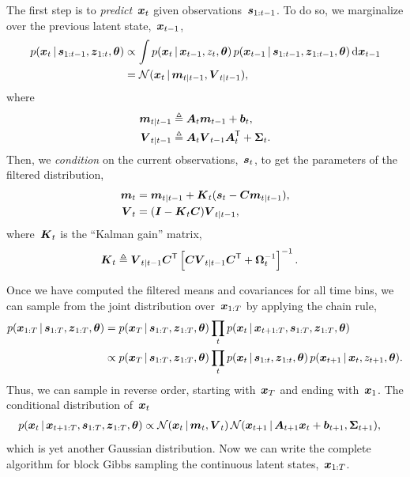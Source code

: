 The first step is to \emph{predict}~$\boldsymbol{x}_t$ given observations~$\boldsymbol{s}_{1:t-1}$.
To do so, we marginalize over the previous latent state,~$\boldsymbol{x}_{t-1}$,
\begin{align*}
  p(\boldsymbol{x}_t \,|\, \boldsymbol{s}_{1:t-1}, \boldsymbol{z}_{1:t}, \boldsymbol{\theta})
  &\propto  \int p(\boldsymbol{x}_t \,|\, \boldsymbol{x}_{t-1}, z_{t}, \boldsymbol{\theta}) \, 
    p(\boldsymbol{x}_{t-1} \,|\, \boldsymbol{s}_{1:t-1}, \boldsymbol{z}_{1:t-1}, \boldsymbol{\theta}) \, \mathrm{d} \boldsymbol{x}_{t-1} \\
  &= \mathcal{N}(\boldsymbol{x}_t \,|\, \boldsymbol{m}_{t|t-1}, \boldsymbol{V}_{t|t-1}),
\end{align*}
where
\begin{align*}
  \boldsymbol{m}_{t|t-1} &\triangleq \boldsymbol{A}_t \boldsymbol{m}_{t-1} + \boldsymbol{b}_t, \\
  \boldsymbol{V}_{t|t-1} &\triangleq \boldsymbol{A}_t \boldsymbol{V}_{t-1}\boldsymbol{A}_t^{\mathsf{T}} + \boldsymbol{\Sigma}_t.
\end{align*}
Then, we \emph{condition} on the current observations,~$\boldsymbol{s}_t$, to get the
parameters of the filtered distribution,
\begin{align}
  \nonumber
  \boldsymbol{m}_t &= \boldsymbol{m}_{t|t-1} + \boldsymbol{K}_t (\boldsymbol{s}_t - \boldsymbol{C} \boldsymbol{m}_{t|t-1}), \\
  \label{eq:kalman_filter}
  \boldsymbol{V}_t &= (\boldsymbol{I} - \boldsymbol{K}_t \boldsymbol{C}) \boldsymbol{V}_{t|t-1},
\end{align}
where~$\boldsymbol{K}_t$ is the ``Kalman gain'' matrix,
\begin{align*}
  \boldsymbol{K}_t &\triangleq \boldsymbol{V}_{t|t-1} \boldsymbol{C}^{\mathsf{T}} \left[ \boldsymbol{C} \boldsymbol{V}_{t|t-1} \boldsymbol{C}^{\mathsf{T}} + \boldsymbol{\Omega}_t^{-1} \right]^{-1}.
\end{align*}

Once we have computed the filtered means and covariances for all
time bins, we can sample from the joint distribution over~$\boldsymbol{x}_{1:T}$
by applying the chain rule,
\begin{align*}
  p(\boldsymbol{x}_{1:T} \,|\, \boldsymbol{s}_{1:T}, \boldsymbol{z}_{1:T}, \boldsymbol{\theta})
  &= p(\boldsymbol{x}_T \,|\, \boldsymbol{s}_{1:T}, \boldsymbol{z}_{1:T}, \boldsymbol{\theta})
  \prod_{t} p(\boldsymbol{x}_{t} \,|\, \boldsymbol{x}_{t+1:T}, \boldsymbol{s}_{1:T}, \boldsymbol{z}_{1:T}, \boldsymbol{\theta}) \\
  &\propto p(\boldsymbol{x}_T \,|\, \boldsymbol{s}_{1:T}, \boldsymbol{z}_{1:T}, \boldsymbol{\theta})
  \prod_{t} p(\boldsymbol{x}_t \,|\, \boldsymbol{s}_{1:t}, \boldsymbol{z}_{1:t}, \boldsymbol{\theta}) \, 
    p(\boldsymbol{x}_{t+1} \,|\, \boldsymbol{x}_{t}, z_{t+1}, \boldsymbol{\theta}).
\end{align*}
Thus, we can sample in reverse order, starting with~$\boldsymbol{x}_T$ and ending
with~$\boldsymbol{x}_1$. The conditional distribution of~${\boldsymbol{x}_t}$
\begin{align}
  \label{eq:bkwd_sample}
  p(\boldsymbol{x}_t \,|\, \boldsymbol{x}_{t+1:T}, \boldsymbol{s}_{1:T}, \boldsymbol{z}_{1:T}, \boldsymbol{\theta})
  &\propto
  \mathcal{N}(\boldsymbol{x}_t \,|\, \boldsymbol{m}_t, \boldsymbol{V}_t) \,
  \mathcal{N}(\boldsymbol{x}_{t+1} \,|\, \boldsymbol{A}_{t+1}\boldsymbol{x}_{t} + \boldsymbol{b}_{t+1}, \boldsymbol{\Sigma}_{t+1}),
\end{align}
which is yet another Gaussian distribution. Now we can write the complete 
algorithm for block Gibbs sampling the continuous latent states,~$\boldsymbol{x}_{1:T}$.

